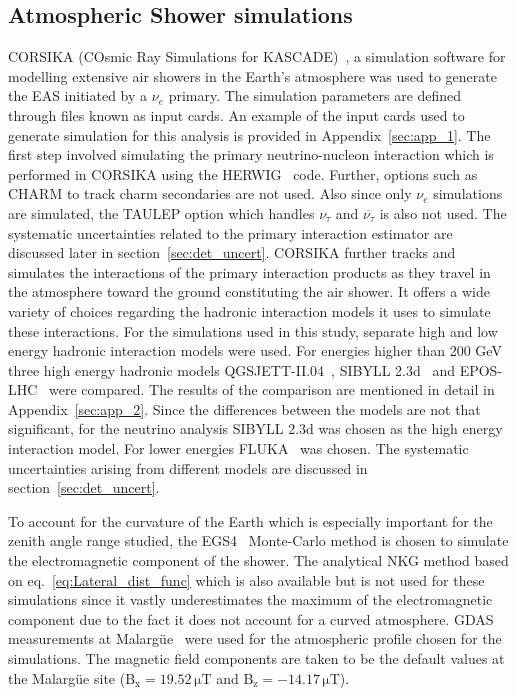 \subsection{Atmospheric Shower simulations}
\label{subsec:sim_EAS}
CORSIKA (COsmic Ray Simulations for KASCADE)~\cite{Heck:1998vt}, a simulation software for modelling extensive air showers in the Earth's atmosphere was used to generate the EAS initiated by a $\nu_e$ primary. The simulation parameters are defined through files known as input cards. An example of the input cards used to generate simulation for this analysis is provided in Appendix~\ref{sec:app_1}. The first step involved simulating the primary neutrino-nucleon interaction which is performed in CORSIKA using the HERWIG~\cite{Corcella:2000bw} code. Further, options such as CHARM to track charm secondaries are not used. Also since only $\nu_e$ simulations are simulated, the TAULEP option which handles $\nu_{\tau}$ and $\overline{\nu_{\tau}}$ is also not used. The systematic uncertainties related to the primary interaction estimator are discussed later in section~\ref{sec:det_uncert}. CORSIKA further tracks and simulates the interactions of the primary interaction products as they travel in the atmosphere toward the ground constituting the air shower. It offers a wide variety of choices regarding the hadronic interaction models it uses to simulate these interactions. For the simulations used in this study, separate high and low energy hadronic interaction models were used. For energies higher than 200 GeV three high energy hadronic models QGSJETT-II.04~\cite{Ostapchenko:2010vb}, SIBYLL 2.3d~\cite{Riehn:2019jet} and EPOS-LHC~\cite{Pierog:2013ria} were compared. The results of the comparison are mentioned in detail in Appendix~\ref{sec:app_2}. Since the differences between the models are not that significant, for the neutrino analysis SIBYLL 2.3d was chosen as the high energy interaction model. For lower energies FLUKA~\cite{Ferrari:2005zk,Battistoni:2015epi} was chosen. The systematic uncertainties arising from different models are discussed in section~\ref{sec:det_uncert}.  

To account for the curvature of the Earth which is especially important for the zenith angle range studied, the EGS4~\cite{Nelson:1990sr} Monte-Carlo method is chosen to simulate the electromagnetic component of the shower. The analytical NKG method based on eq.~\ref{eq:Lateral_dist_func} which is also available but is not used for these simulations since it vastly underestimates the maximum of the electromagnetic component due to the fact it does not account for a curved atmosphere. \gls{GDAS} measurements at Malargüe~\cite{PierreAuger:2012jsu} were used for the atmospheric profile chosen for the simulations. The magnetic field components are taken to be the default values at the Malargüe site ($\mathrm{B_x = 19.52\,\mu T}$ and $\mathrm{B_z = -14.17 \,\mu T}$). 

